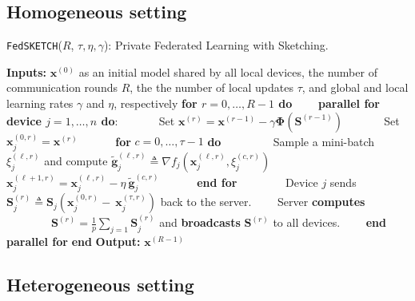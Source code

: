 \subsection{Homogeneous setting}
\begin{algorithm}[H]
\caption{\texttt{FedSKETCH}($R$, $\tau, \eta, \gamma$): Private Federated Learning with Sketching. }\label{Alg:PFLHom}
\begin{algorithmic}[1]
\State \textbf{Inputs:} $\boldsymbol{x}^{(0)}$ as an initial  model shared by all local devices, the number of communication rounds $R$, the the number of local updates $\tau$, and global and local learning rates $\gamma$ and $\eta$, respectively
\State \textbf{for $r=0, \ldots, R-1$ do}
\State $\qquad$\textbf{parallel for device $j=1,\ldots,n$ do}:
\State $\qquad\quad$ Set $\boldsymbol{x}^{(r)}=\boldsymbol{x}^{(r-1)}-\gamma{\mathbf{\Phi}}\left({\mathbf{S}}^{(r-1)}\right)$
\State $\qquad\quad$ Set $\boldsymbol{x}_j^{(0,r)}=\boldsymbol{x}^{(r)}$ 
\State $\qquad\quad $\textbf{for} $c=0,\ldots,\tau-1$ \textbf{do}
\State $\qquad\quad\quad$ Sample a mini-batch $\xi_j^{(\ell,r)}$ and compute $\tilde{\mathbf{g}}_{j}^{(\ell,r)}\triangleq\nabla{f}_j(\boldsymbol{x}^{(\ell,r)}_j,\xi_j^{(c,r)})$
\State $\qquad\quad\quad$ $\boldsymbol{x}^{(\ell+1,r)}_{j}=\boldsymbol{x}^{(\ell,r)}_j-\eta~ \tilde{\mathbf{g}}_{j}^{(c,r)}$ \label{eq:update-rule-alg}
\State $\qquad\quad$\textbf{end for}
\State $\qquad\quad\quad$Device $j$ sends $\mathbf{S}^{(r)}_{j}\triangleq\mathbf{S}_{j}\left(\boldsymbol{x}_j^{(0,r)}-~{\boldsymbol{x}}_{j}^{(\tau,r)}\right)$ back to the server.
\State $\qquad$Server \textbf{computes} 
\State $\qquad\qquad {\mathbf{S}}^{(r)}=\frac{1}{p}\sum_{j=1}\mathbf{S}^{(r)}_{j}$ and \textbf{broadcasts} ${\mathbf{S}}^{(r)}$ to all devices.
\State $\qquad$\textbf{end parallel for}
\State \textbf{end}
\State \textbf{Output:} ${\boldsymbol{x}}^{(R-1)}$
\vspace{- 0.1cm}
\end{algorithmic}
\end{algorithm}

\subsection{Heterogeneous setting}

